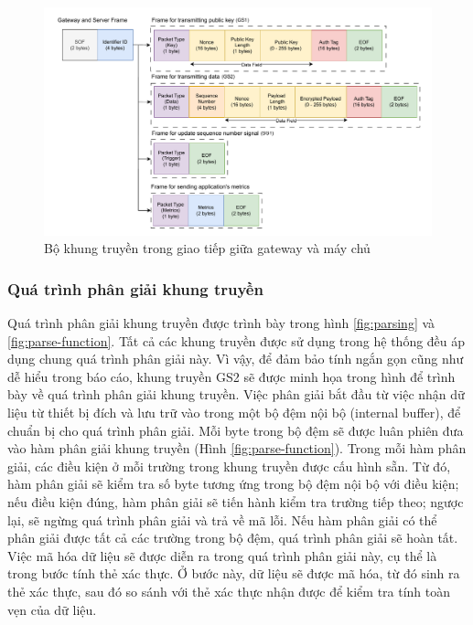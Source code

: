 \begin{figure}
    \centering
    \includegraphics[width=1\linewidth]{gs-frame.pdf}
    \caption{Bộ khung truyền trong giao tiếp giữa gateway và máy chủ}
    \label{fig:gs-frame}
\end{figure}
\subsubsection{Quá trình phân giải khung truyền}
Quá trình phân giải khung truyền được trình bày trong hình \ref{fig:parsing} và \ref{fig:parse-function}. Tất cả các khung truyền được sử dụng trong hệ thống đều áp dụng chung quá trình phân giải này. Vì vậy, để đảm bảo tính ngắn gọn cũng như dễ hiểu trong báo cáo, khung truyền GS2 sẽ được minh họa trong hình để trình bày về quá trình phân giải khung truyền. Việc phân giải bắt đầu từ việc nhận dữ liệu từ thiết bị đích và lưu trữ vào trong một bộ đệm nội bộ (internal buffer), để chuẩn bị cho quá trình phân giải. Mỗi byte trong bộ đệm sẽ được luân phiên đưa vào hàm phân giải khung truyền (Hình \ref{fig:parse-function}). Trong mỗi hàm phân giải, các điều kiện ở mỗi trường trong khung truyền được cấu hình sẵn. Từ đó, hàm phân giải sẽ kiểm tra số byte tương ứng trong bộ đệm nội bộ với điều kiện; nếu điều kiện đúng, hàm phân giải sẽ tiến hành kiểm tra trường tiếp theo; ngược lại, sẽ ngừng quá trình phân giải và trả về mã lỗi. Nếu hàm phân giải có thể phân giải được tất cả các trường trong bộ đệm, quá trình phân giải sẽ hoàn tất. Việc mã hóa dữ liệu sẽ được diễn ra trong quá trình phân giải này, cụ thể là trong bước tính thẻ xác thực. Ở bước này, dữ liệu sẽ được mã hóa, từ đó sinh ra thẻ xác thực, sau đó so sánh với thẻ xác thực nhận được để kiểm tra tính toàn vẹn của dữ liệu. 


